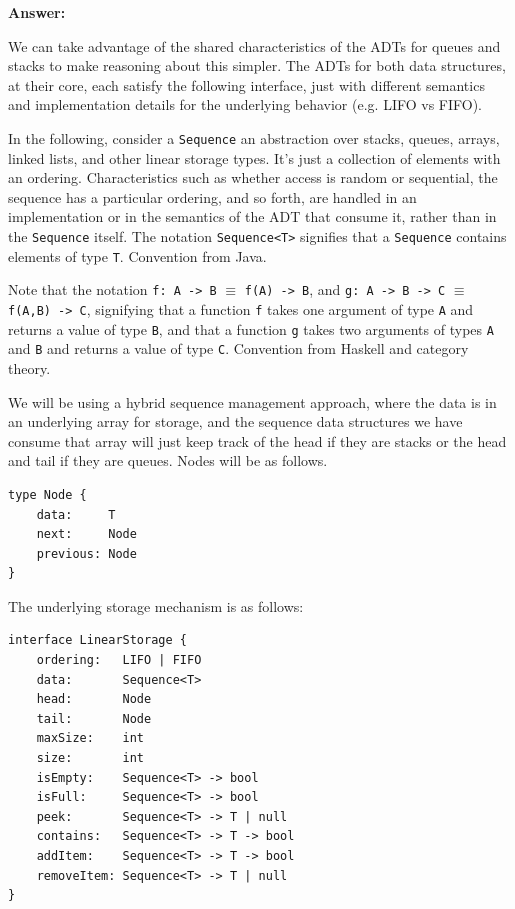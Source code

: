 \documentclass[10pt,letterpaper,final]{report}
\begin{document}
\medskip
\noindent\textbf{Answer:}
\medskip

We can take advantage of the shared characteristics of the ADTs for queues and stacks to make reasoning about this simpler. The ADTs for both data structures, at their core, each satisfy the following interface, just with different semantics and implementation details for the underlying behavior (e.g. LIFO vs FIFO).

\begin{tcolorbox}[colback=gray!10!white, colframe=gray!80!black, title=Note]
  In the following, consider a \texttt{Sequence} an abstraction over stacks, queues, arrays, linked lists, and other linear storage types. It's just a collection of elements with an ordering. Characteristics such as whether access is random or sequential, the sequence has a particular ordering, and so forth, are handled in an implementation or in the semantics of the ADT that consume it, rather than in the \texttt{Sequence} itself. The notation \texttt{Sequence<T>} signifies that a \texttt{Sequence} contains elements of type \texttt{T}. Convention from Java.
  \medskip

  Note that the notation \texttt{f: A -> B} $\equiv$ \texttt{f(A) -> B}, and \texttt{g: A -> B -> C} $\equiv$ \texttt{f(A,B) -> C}, signifying that a function \texttt{f} takes one argument of type \texttt{A} and returns a value of type \texttt{B}, and that a function \texttt{g} takes two arguments of types \texttt{A} and \texttt{B} and returns a value of type \texttt{C}. Convention from Haskell and category theory.
\end{tcolorbox}

We will be using a hybrid sequence management approach, where the data is in an underlying array for storage, and the sequence data structures we have consume that array will just keep track of the head if they are stacks or the head and tail if they are queues. Nodes will be as follows.

\begin{verbatim}
type Node {
    data:     T
    next:     Node
    previous: Node
}
\end{verbatim}

The underlying storage mechanism is as follows:

\begin{verbatim}
interface LinearStorage {
    ordering:   LIFO | FIFO
    data:       Sequence<T>
    head:       Node
    tail:       Node
    maxSize:    int
    size:       int
    isEmpty:    Sequence<T> -> bool
    isFull:     Sequence<T> -> bool
    peek:       Sequence<T> -> T | null
    contains:   Sequence<T> -> T -> bool
    addItem:    Sequence<T> -> T -> bool
    removeItem: Sequence<T> -> T | null
}
\end{verbatim}
\end{document}

